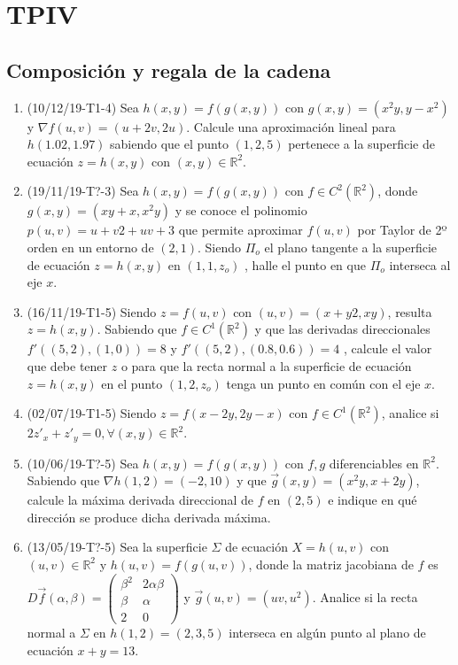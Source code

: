 \documentclass[12pt,a4paper]{article}
\newcommand{\R}{\mathbb{R}}
\begin{document}
\section{TPIV}
\subsection{Composición y regala de la cadena}
\begin{enumerate}
	\item (10/12/19-T1-4) Sea $ h ( x , y ) = f ( g ( x , y )) $ con $ g ( x , y ) = ( x^2 y , y - x^2 ) $ y $\nabla f ( u , v ) = ( u + 2 v , 2 u ) $. Calcule una aproximación lineal para $ h ( 1.02 , 1.97 ) $ sabiendo que el punto $ ( 1 , 2 , 5 ) $ pertenece a la superficie de ecuación	$ z = h ( x , y ) $ con $ ( x , y )\in \R^2$.
	
	\item (19/11/19-T?-3) Sea $h ( x , y ) = f ( g ( x , y ))$ con $f \in C^2 ( \R^2 ) $, donde $g ( x , y ) = ( x y + x , x^2 y )$ y se conoce el polinomio $ p ( u , v ) = u + v 2 + u v + 3 $ que permite aproximar $ f ( u , v ) $ por Taylor de 2º orden en un entorno de	$ ( 2 , 1 )  $. Siendo $ \Pi_o  $ el plano tangente a la superficie de ecuación $ z = h ( x , y ) $ en $ ( 1 , 1 , z_o ) $ , halle el punto en que $ \Pi_o $ interseca al eje $ x  $.
	
	\item (16/11/19-T1-5) Siendo $ z = f ( u , v ) $ con $ ( u , v ) = ( x + y 2 , x y )  $, resulta $ z = h ( x , y )  $. Sabiendo que $f\in C^1(\R^2)$ y que las derivadas direccionales $f'( ( 5 , 2 ) , ( 1 , 0 )) = 8$ y $f'( ( 5 , 2 ) , ( 0 . 8 , 0 . 6 )) = 4$ , calcule el valor que debe tener $z$ o para que la recta normal a la superficie de ecuación $z = h ( x , y )$ en el punto $( 1 , 2 , z_o )$ tenga un punto en común con el eje $x$.
	
	\item (02/07/19-T1-5) Siendo $z = f ( x - 2 y , 2 y - x )$ con $f\in C^1 (\R^2 )$, analice si $2 z'_x + z'_y = 0, \forall ( x , y ) \in \R^2$.
	
	\item (10/06/19-T?-5) Sea $h ( x , y ) = f ( g ( x , y ))$ con $f , g$ diferenciables en $\R^2$. Sabiendo que $\nabla h ( 1 , 2 ) = ( - 2 , 10 )$ y que	$\vec{g} ( x , y ) = ( x^2 y , x + 2 y ) $, calcule la máxima derivada direccional de $f$ en $( 2 , 5 )$ e indique en qué dirección se produce dicha derivada máxima.
	
	\item (13/05/19-T?-5) Sea la superficie $\Sigma$ de ecuación $X = h ( u , v )$ con $( u , v ) \in \R^2$ y $h ( u , v ) = f ( g ( u , v )) $, donde la matriz jacobiana de $f$ es $D\vec{f}(\alpha, \beta)=\left(\begin{matrix}
	\beta^2 & 2\alpha\beta\\
	\beta & \alpha\\
	2 & 0
	\end{matrix}\right)$ y $\vec{g} ( u , v ) = ( u v , u^2 ) $.
	Analice si la recta normal a $\Sigma$ en $h ( 1 , 2 ) = ( 2 , 3 , 5 )$ interseca en algún punto al plano de ecuación	$x + y = 13 $.
	

\end{enumerate}
\end{document}
